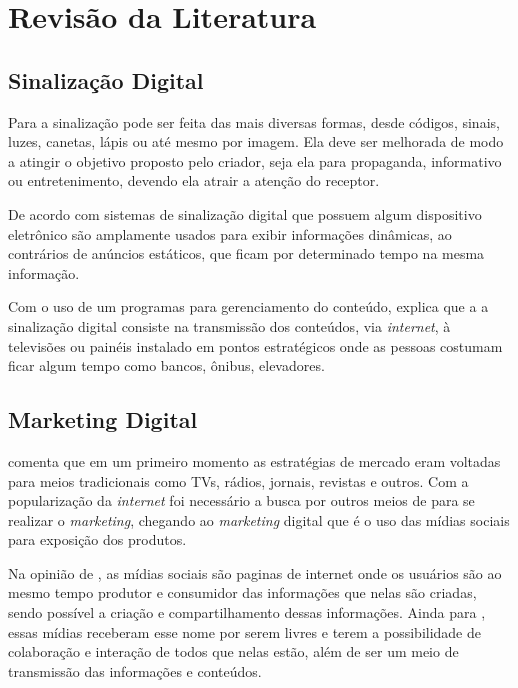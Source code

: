 \documentclass[
	12pt,				%
	openright,			%
	oneside,			%
	a4paper,			%
	english,			%
	french,				%
	spanish,			%
	brazil,				%
	]{abntex2}
\begin{document}
\section*{Revisão da Literatura}
	
	\subsection*{Sinalização Digital}
	Para \cite{munari2006} a sinalização pode ser feita das mais diversas formas, desde códigos, sinais, luzes, canetas, lápis ou até mesmo por imagem. Ela deve ser melhorada de modo a  atingir o objetivo proposto pelo criador, seja ela para propaganda, informativo ou entretenimento, devendo ela atrair a atenção do receptor. 
	
	De acordo com \cite{mishima2016} sistemas de sinalização digital que possuem algum dispositivo eletrônico são amplamente usados para exibir informações dinâmicas, ao contrários de anúncios estáticos, que ficam por determinado tempo na mesma informação. 
	
	Com o uso de um programas para gerenciamento do conteúdo, \cite{machado2010} explica que a a sinalização digital consiste na transmissão dos conteúdos, via \textit{internet}, à televisões ou painéis instalado em pontos estratégicos onde as pessoas costumam ficar algum tempo como bancos, ônibus, elevadores.
	
	\subsection*{Marketing Digital}
	\cite{santos2014} comenta que em um primeiro momento as estratégias de mercado eram voltadas para meios tradicionais como TVs, rádios, jornais, revistas e outros. Com a popularização da \textit{internet} foi necessário a busca por outros meios de para se realizar o \textit{marketing}, chegando ao \textit{marketing} digital que é o uso das mídias sociais para exposição dos produtos.
	
	Na opinião de \cite{torres2000}, as mídias sociais são paginas de internet onde os usuários são ao mesmo tempo produtor e consumidor das informações que nelas são criadas, sendo possível a criação e compartilhamento dessas informações. Ainda para \cite{torres2000}, essas mídias receberam esse nome por serem livres e terem a possibilidade de colaboração e interação de todos que nelas estão, além de ser um meio de transmissão das informações e conteúdos.
	
\end{document}
